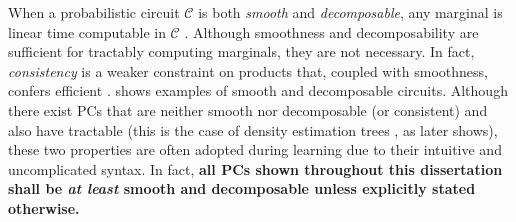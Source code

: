 When a probabilistic circuit $\mathcal{C}$ is both \emph{smooth} and \emph{decomposable}, any
marginal is linear time computable in $\mathcal{C}$ \citep{poon11,peharz15}. Although smoothness
and decomposability are sufficient for tractably computing marginals, they are not necessary. In
fact, \emph{consistency} is a weaker constraint on products that, coupled with smoothness, confers
efficient \mar{} \citep{poon11}.  shows examples of smooth and decomposable
circuits. Although there exist PCs that are neither smooth nor decomposable (or consistent) and
also have tractable \mar{} (this is the case of density estimation trees \citep{ram11}, as
 later shows), these two properties are often adopted during learning due to their
intuitive and uncomplicated syntax. In fact, \textbf{all PCs shown throughout this dissertation
shall be \emph{at least} smooth and decomposable unless explicitly stated otherwise.}

